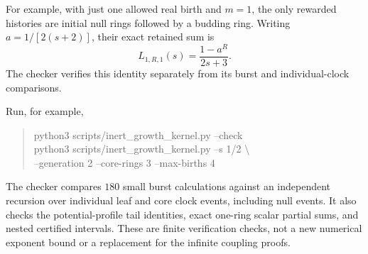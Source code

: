 For example, with just one allowed real birth and $m=1$, the only
rewarded histories are initial null rings followed by a budding ring.
Writing $a=1/[2(s+2)]$, their exact retained sum is
\[
 L_{1,R,1}(s)=\frac{1-a^R}{2s+3}.
\]
The checker verifies this identity separately from its burst and
individual-clock comparisons.

Run, for example,
\begin{quote}\small\ttfamily
python3 scripts/inert\_growth\_kernel.py --check\\
python3 scripts/inert\_growth\_kernel.py --s 1/2 \textbackslash\\
\hspace*{1em}--generation 2 --core-rings 3 --max-births 4
\end{quote}
The checker compares $180$ small burst calculations against an
independent recursion over individual leaf and core clock events,
including null events. It also checks the potential-profile tail
identities, exact one-ring scalar partial sums, and nested certified
intervals. These are finite verification checks, not a new numerical
exponent bound or a replacement for the infinite coupling proofs.
